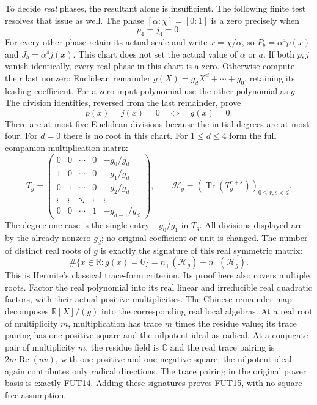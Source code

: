 To decide \emph{real} phases, the resultant alone is insufficient.
The following finite test resolves that issue as well. The phase
$[\alpha:\chi]=[0:1]$ is a zero precisely when
\[
                         p_4=j_4=0.
 \tag{FUT12}
\]
For every other phase retain its actual scale and write
$x=\chi/\alpha$, so $P_b=\alpha^4p(x)$ and
$J_b=\alpha^4j(x)$. This chart does not set the actual value of
$\alpha$ or $a$. If both $p,j$ vanish identically, every real phase
in this chart is a zero. Otherwise compute their last nonzero Euclidean
remainder $g(X)=g_dX^d+\cdots+g_0$, retaining its leading coefficient.
For a zero input polynomial use the other polynomial as $g$.
The division identities, reversed from the last remainder, prove
\[
             p(x)=j(x)=0\quad\Longleftrightarrow\quad g(x)=0.
 \tag{FUT13}
\]
There are at most five Euclidean divisions because the initial degrees
are at most four. For $d=0$ there is no root in this chart.
For $1\le d\le4$ form the full companion multiplication matrix
\[
 T_g=\begin{pmatrix}
 0&0&\cdots&0&-g_0/g_d\\
 1&0&\cdots&0&-g_1/g_d\\
 0&1&\cdots&0&-g_2/g_d\\
 \vdots&\vdots&\ddots&\vdots&\vdots\\
 0&0&\cdots&1&-g_{d-1}/g_d
 \end{pmatrix},\qquad
 \mathcal H_g=(\operatorname{Tr}(T_g^{r+s}))_{0\le r,s<d}.
 \tag{FUT14}
\]
The degree-one case is the single entry $-g_0/g_1$ in $T_g$.
All divisions displayed are by the already nonzero $g_d$; no original
coefficient or unit is changed. The number of distinct real roots of
$g$ is exactly the signature of this real symmetric matrix:
\[
   \#\{x\in\mathbb R:g(x)=0\}
          =n_+(\mathcal H_g)-n_-(\mathcal H_g).
 \tag{FUT15}
\]
This is Hermite's classical trace-form criterion. Its proof here also
covers multiple roots. Factor the real polynomial into its real linear
and irreducible real quadratic factors, with their actual positive
multiplicities. The Chinese remainder map decomposes
$\mathbb R[X]/(g)$ into the corresponding real local algebras.
At a real root of multiplicity $m$, multiplication has trace $m$
times the residue value; its trace pairing has one positive square
and the nilpotent ideal as radical. At a conjugate pair of multiplicity
$m$, the residue field is $\mathbb C$ and the real trace pairing is
$2m\operatorname{Re}(uv)$, with one positive and one negative square;
the nilpotent ideal again contributes only radical directions.
The trace pairing in the original power basis is exactly FUT14.
Adding these signatures proves FUT15, with no square-free assumption.

